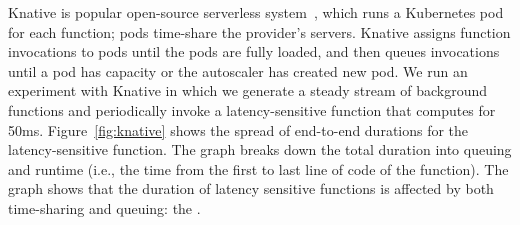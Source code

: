 Knative is popular open-source serverless system~\cite{knative}, which runs a
Kubernetes pod for each function; pods time-share the provider's servers.
Knative assigns function invocations to pods until the pods are fully loaded, and
then queues invocations until a pod has capacity or the autoscaler has created
new pod. We run an experiment with Knative in which we generate a steady stream
of background functions and periodically invoke a latency-sensitive function
that computes for 50ms. Figure~\ref{fig:knative} shows the spread of end-to-end
durations for the latency-sensitive function.  The graph breaks down the total
duration into queuing and runtime (i.e., the time from the first to last line of
code of the function).  The graph shows that the duration of latency sensitive
functions is affected by both time-sharing and queuing: the \problem{}.






